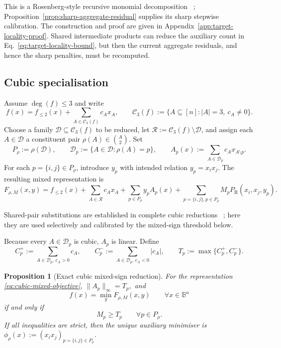 \documentclass[a4paper,onecolumn,11pt,unpublished]{quantumarticle}
\newtheorem{proposition}[proposition]{Proposition}
\theoremstyle{remark}
\begin{document}
This is a Rosenberg-style recursive monomial decomposition
~\cite{Rosenberg1975,BorosGruber2014,CramaEtAl2025};
Proposition~\ref{prop:sharp-aggregate-residual} supplies its sharp stepwise
calibration.
The construction and proof are given in
Appendix~\ref{app:target-locality-proof}.  Shared intermediate products can
reduce the auxiliary count in Eq.~\eqref{eq:target-locality-bound}, but then
the current aggregate residuals, and hence the sharp penalties, must be
recomputed.

\subsection{Cubic specialisation}
\label{sec:cubic-specialisation}

Assume $\deg(f)\le 3$ and write
\begin{equation}
f(x)=f_{\le 2}(x)+\sum_{A\in\mathcal C_3(f)} c_Ax_A,
\qquad
\mathcal C_3(f):=\{A\subseteq[n]:|A|=3,\ c_A\neq0\}.
\label{eq:cubic-decomposition}
\end{equation}
Choose a family $\mathcal D\subseteq\mathcal C_3(f)$ to be reduced, let
$\mathcal R:=\mathcal C_3(f)\setminus\mathcal D$, and assign each
$A\in\mathcal D$ a constituent pair
\(
\rho(A)\in\binom{A}{2}.
\)
Set
\[
P_\rho:=\rho(\mathcal D),
\qquad
\mathcal D_p:=\{A\in\mathcal D:\rho(A)=p\},
\qquad
A_p(x):=\sum_{A\in\mathcal D_p} c_Ax_{A\setminus p}.
\]
For each $p=\{i,j\}\in P_\rho$, introduce $y_p$ with intended relation
$y_p=x_ix_j$. The resulting mixed representation is
\begin{equation}
F_{\rho,M}(x,y)
=
f_{\le2}(x)
+\sum_{A\in\mathcal R}c_Ax_A
+\sum_{p\in P_\rho}y_pA_p(x)
+\sum_{p=\{i,j\}, p\in P_\rho}
M_pP_{\mathrm R}(x_i,x_j,y_p).
\label{eq:cubic-mixed-objective}
\end{equation}

Shared-pair substitutions are established in complete cubic reductions
~\cite{VermaLewisKochenberger2021}; here they are used selectively and
calibrated by the mixed-sign threshold below.

Because every $A\in\mathcal D_p$ is cubic, $A_p$ is linear. Define
\begin{equation}
C_p^+
:=
\sum_{A\in\mathcal D_p,\,c_A>0}c_A,
\qquad
C_p^-
:=
\sum_{A\in\mathcal D_p, \,c_A<0}|c_A|,
\qquad
T_p:=\max\{C_p^+,C_p^-\}.
\label{eq:cubic-threshold}
\end{equation}

\begin{proposition}[Exact cubic mixed-sign reduction]
\label{prop:cubic-mixed-sign}
For the representation \eqref{eq:cubic-mixed-objective},
\(
\|A_p\|_\infty=T_p,
\)
and
\begin{equation}
f(x)=\min_y F_{\rho,M}(x,y)
\qquad\forall x\in\mathbb B^n
\label{eq:cubic-pointwise-exactness}
\end{equation}
if and only if
\[
M_p\ge T_p
\qquad\forall p\in P_\rho.
\]
If all inequalities are strict, then the unique auxiliary minimiser is
\(
\phi_\rho(x):=(x_ix_j)_{p=\{i,j\}\in P_\rho}.
\)
\end{proposition}
\end{document}
